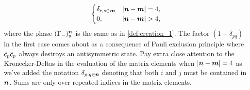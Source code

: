 \begin{lemma}
\begin{gather}
\begin{cases}
                        \delta_{r, s \in \boldsymbol{m}}
                        & \abs{\boldsymbol{n} - \boldsymbol{m}} = 4,
                        \\
                        0, & \abs{\boldsymbol{n} - \boldsymbol{m}} > 4,
                    \end{cases}
                \end{gather}
                where the phase $(\Gamma_{-})^{\boldsymbol{n}}_{p}$ is the same as in
                \autoref{def:creation_1}.
                The factor $(1 - \delta_{pq})$ in the first case comes about as
                a consequence of Pauli exclusion principle where
                $\hat{c}_{p}\hat{c}_{p}$ always destroys an antisymmetric state.
                Pay extra close attention to the Kronecker-Deltas in the
                evaluation of the matrix elements when $\abs{\boldsymbol{n} - \boldsymbol{m}}
                = 4$ as we've added the notation $\delta_{p, q \in \boldsymbol{n}}$
                denoting that both $i$ and $j$ must be contained in $\boldsymbol{n}$.
                Sums are only over repeated indices in the matrix elements.
            \end{lemma}

